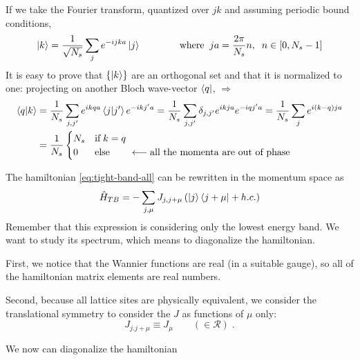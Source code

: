 If we take the Fourier transform, quantized over $jk$ and assuming periodic bound conditions,
\begin{equation}
\label{eq:tight-basis-def}
    \ket{k} = \frac{1}{\sqrt{N_s}}\sum_j e^{-ijka}\ket{j} \qquad\qquad \text{where}\;\; ja = \frac{2\pi}{N_s}n,\;\; n\in[0,N_s-1]
\end{equation}
%
\noindent It is easy to prove that $\{\ket{k}\}$ are an orthogonal set and that it is normalized to one: projecting on another Bloch wave-vector $\bra{q}$, $\Rightarrow$
\begin{align}
    \bra{q}\ket{k} &= \frac{1}{N_s} \sum_{j,j'} e^{ikqa}\bra{j}\ket{j'}e^{-ikj'a} 
    = \frac{1}{N_s} \sum_{j,j'} \delta_{j,j'} e^{ikja}e^{-iqj'a}
    = \frac{1}{N_s} \sum_j e^{i(k-q)ja}\nonumber\\
    &= \frac{1}{N_s}
    \begin{cases}
        N_s& \text{if}\; k=q\\
        0 &\text{else}  \qquad \longleftarrow \text{all the momenta are out of phase}
    \end{cases}
    \label{eq:phase-sum}
\end{align}



The hamiltonian \ref{eq:tight-band-all} can be rewritten in the momentum space as
\begin{equation}
\label{eq:tight-band-momentum}
    \hat{H}_{TB} = -\sum_{j,\mu} J_{j,j+\mu}\left( \ket{j}\bra{j+\mu} + h.c. \right)
\end{equation}
Remember that this expression is considering only the lowest energy band. We want to study its spectrum, which means to diagonalize the hamiltonian.

First, we notice that the Wannier functions are real (in a suitable gauge), so all of the hamiltonian matrix elements are real numbers.

\noindent Second, because all lattice sites are physically equivalent, we consider the translational symmetry to consider the $J$ as functions of $\mu$ only:
\begin{equation*}
    J_{j.j+\mu} \equiv J_\mu \qquad (\in \mathcal{R}) \;.
\end{equation*}

\noindent We now can diagonalize the hamiltonian


